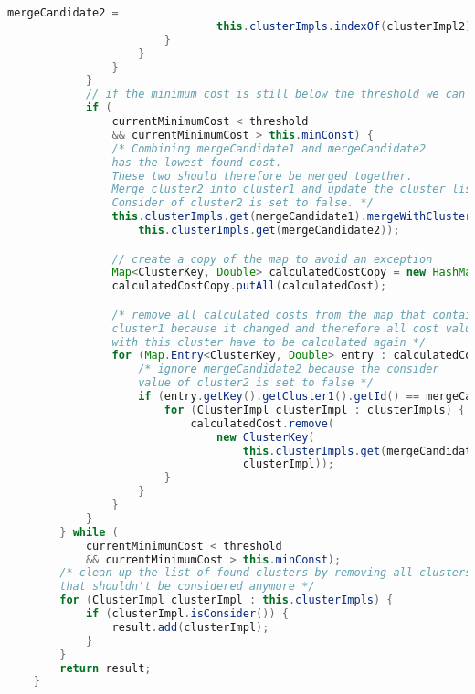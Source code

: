 \begin{lstlisting}[language=Java, caption=Hierarchisches Clustering.]
                            mergeCandidate2 =
                                this.clusterImpls.indexOf(clusterImpl2);
                        }
                    }
                }
            }
            // if the minimum cost is still below the threshold we can continue
            if (
                currentMinimumCost < threshold
                && currentMinimumCost > this.minConst) {
                /* Combining mergeCandidate1 and mergeCandidate2
                has the lowest found cost.
                These two should therefore be merged together.
                Merge cluster2 into cluster1 and update the cluster list.
                Consider of cluster2 is set to false. */
                this.clusterImpls.get(mergeCandidate1).mergeWithCluster(
                    this.clusterImpls.get(mergeCandidate2));

                // create a copy of the map to avoid an exception
                Map<ClusterKey, Double> calculatedCostCopy = new HashMap<>();
                calculatedCostCopy.putAll(calculatedCost);

                /* remove all calculated costs from the map that contain
                cluster1 because it changed and therefore all cost values
                with this cluster have to be calculated again */
                for (Map.Entry<ClusterKey, Double> entry : calculatedCostCopy.entrySet()) {
                    /* ignore mergeCandidate2 because the consider
                    value of cluster2 is set to false */
                    if (entry.getKey().getCluster1().getId() == mergeCandidate1) {
                        for (ClusterImpl clusterImpl : clusterImpls) {
                            calculatedCost.remove(
                                new ClusterKey(
                                    this.clusterImpls.get(mergeCandidate1),
                                    clusterImpl));
                        }
                    }
                }
            }
        } while (
            currentMinimumCost < threshold
            && currentMinimumCost > this.minConst);
        /* clean up the list of found clusters by removing all clusters
        that shouldn't be considered anymore */
        for (ClusterImpl clusterImpl : this.clusterImpls) {
            if (clusterImpl.isConsider()) {
                result.add(clusterImpl);
            }
        }
        return result;
    }
\end{lstlisting}

